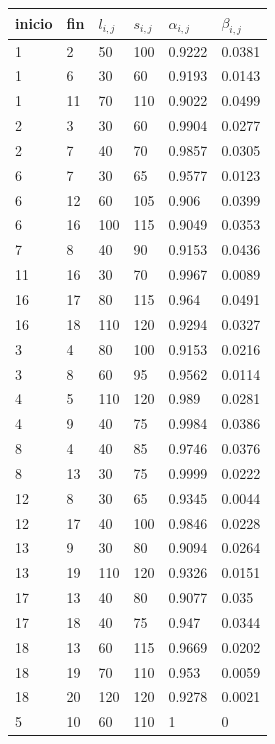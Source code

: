 \documentclass[letter, 10pt]{article}
\begin{document}
\begin{table}[H]
\centering
\begin{tabular}{|l|l|l|l|l|l|}
\hline
inicio & fin & $l_{i,j}$ & $s_{i,j}$ & $\alpha_{i,j}$ & $\beta_{i,j}$ \\ \hline
1 & 2 & 50 & 100 & 0.9222 & 0.0381 \\ \hline
1 & 6 & 30 & 60 & 0.9193 & 0.0143 \\ \hline
1 & 11 & 70 & 110 & 0.9022 & 0.0499 \\ \hline
2 & 3 & 30 & 60 & 0.9904 & 0.0277 \\ \hline
2 & 7 & 40 & 70 & 0.9857 & 0.0305 \\ \hline
6 & 7 & 30 & 65 & 0.9577 & 0.0123 \\ \hline
6 & 12 & 60 & 105 & 0.906 & 0.0399 \\ \hline
6 & 16 & 100 & 115 & 0.9049 & 0.0353 \\ \hline
7 & 8 & 40 & 90 & 0.9153 & 0.0436 \\ \hline
11 & 16 & 30 & 70 & 0.9967 & 0.0089 \\ \hline
16 & 17 & 80 & 115 & 0.964 & 0.0491 \\ \hline
16 & 18 & 110 & 120 & 0.9294 & 0.0327 \\ \hline
3 & 4 & 80 & 100 & 0.9153 & 0.0216 \\ \hline
3 & 8 & 60 & 95 & 0.9562 & 0.0114 \\ \hline
4 & 5 & 110 & 120 & 0.989 & 0.0281 \\ \hline
4 & 9 & 40 & 75 & 0.9984 & 0.0386 \\ \hline
8 & 4 & 40 & 85 & 0.9746 & 0.0376 \\ \hline
8 & 13 & 30 & 75 & 0.9999 & 0.0222 \\ \hline
12 & 8 & 30 & 65 & 0.9345 & 0.0044 \\ \hline
12 & 17 & 40 & 100 & 0.9846 & 0.0228 \\ \hline
13 & 9 & 30 & 80 & 0.9094 & 0.0264 \\ \hline
13 & 19 & 110 & 120 & 0.9326 & 0.0151 \\ \hline
17 & 13 & 40 & 80 & 0.9077 & 0.035 \\ \hline
17 & 18 & 40 & 75 & 0.947 & 0.0344 \\ \hline
18 & 13 & 60 & 115 & 0.9669 & 0.0202 \\ \hline
18 & 19 & 70 & 110 & 0.953 & 0.0059 \\ \hline
18 & 20 & 120 & 120 & 0.9278 & 0.0021 \\ \hline
5 & 10 & 60 & 110 & 1 & 0 \\ \hline

\end{tabular}
\end{table}
\end{document}
